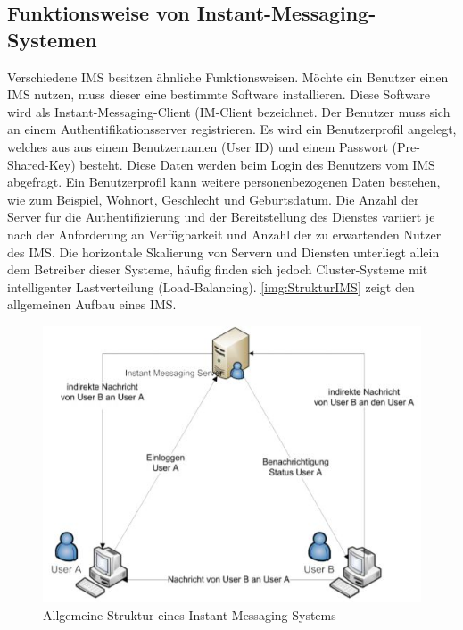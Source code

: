 \documentclass[a4paper,titlepage,halfparskip,12pt]{scrreprt}
\begin{document}
\begin{onehalfspacing}
\section{Funktionsweise von Instant-Messaging-Systemen}
\label{sec:IMSFunktion}

Verschiedene \ac{IMS} besitzen ähnliche Funktionsweisen. Möchte ein Benutzer einen \ac{IMS} nutzen, muss dieser eine bestimmte Software installieren. Diese Software wird als Instant-Messaging-Client (IM-Client bezeichnet. Der Benutzer muss sich an einem Authentifikationsserver registrieren. Es wird ein Benutzerprofil angelegt, welches aus aus einem Benutzernamen (User ID) und einem Passwort (Pre-Shared-Key) besteht. Diese Daten werden beim Login des Benutzers vom \ac{IMS} abgefragt. Ein Benutzerprofil kann weitere personenbezogenen Daten bestehen, wie zum Beispiel, Wohnort, Geschlecht und Geburtsdatum. Die Anzahl der Server für die Authentifizierung und der Bereitstellung des Dienstes variiert je nach der Anforderung an Verfügbarkeit und Anzahl der zu erwartenden Nutzer des \ac{IMS}. Die horizontale Skalierung von Servern und Diensten unterliegt allein dem Betreiber dieser Systeme, häufig finden sich jedoch Cluster-Systeme mit intelligenter Lastverteilung (Load-Balancing). \autoref{img:StrukturIMS} zeigt den allgemeinen Aufbau eines \ac{IMS}.\cite{anastasiaIMS}

\begin{figure}[h]
	\centering
	\includegraphics[width=.65\textwidth]{images/GrundlegendeStrukturIMS}
	\caption{Allgemeine Struktur eines Instant-Messaging-Systems \cite{anastasiaIMS}}
	\label{img:StrukturIMS}
\end{figure}


\end{onehalfspacing}
\end{document}
